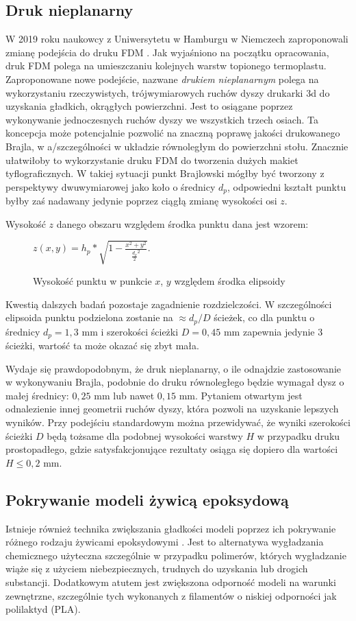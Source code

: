 \documentclass[12pt,a4paper]{article}
\begin{document}
\subsection{Druk nieplanarny}
W 2019 roku naukowcy z Uniwersytetu w Hamburgu w Niemczech zaproponowali zmianę podejścia do druku FDM \cite{nonplanar}. Jak wyjaśniono na początku opracowania, druk FDM polega na umieszczaniu kolejnych warstw topionego termoplastu. Zaproponowane nowe podejście, nazwane \emph{drukiem nieplanarnym} polega na wykorzystaniu rzeczywistych, trójwymiarowych ruchów dyszy drukarki 3d do uzyskania gładkich, okrągłych powierzchni. Jest to osiągane poprzez wykonywanie jednoczesnych ruchów dyszy we wszystkich trzech osiach.
Ta koncepcja może potencjalnie pozwolić na znaczną poprawę jakości drukowanego Brajla, w a/szczególności w układzie równoległym do powierzchni stołu. Znacznie ułatwiłoby to wykorzystanie druku FDM do tworzenia dużych makiet tyflograficznych.
W takiej sytuacji punkt Brajlowski mógłby być tworzony z perspektywy dwuwymiarowej jako koło o średnicy $d_p$, odpowiedni kształt punktu byłby zaś nadawany jedynie poprzez ciągłą zmianę wysokości osi $z$.

Wysokość $z$ danego obszaru względem środka punktu dana jest wzorem:

\begin{figure}
$z(x,y) = h_p * \sqrt{1 - \frac{x^2+y^2}{\frac{d_p}{2}^2}}$.
\caption{Wysokość punktu w punkcie $x$, $y$ względem środka elipsoidy}
\end{figure}

Kwestią dalszych badań pozostaje zagadnienie rozdzielczości. W szczególności elipsoida punktu podzielona zostanie na $\approx d_p/D$ ścieżek, co dla punktu o średnicy $d_p=1,3 \text{ mm}$ i szerokości ścieżki $D=0,45 \text{ mm}$ zapewnia jedynie 3 ścieżki, wartość ta może okazać się zbyt mała.

Wydaje się prawdopodobnym, że druk nieplanarny, o ile odnajdzie zastosowanie w wykonywaniu Brajla, podobnie do druku równoległego będzie wymagał dysz o małej średnicy: $0,25 \text{ mm}$ lub nawet $0,15 \text{ mm}$. Pytaniem otwartym jest odnalezienie innej geometrii ruchów dyszy, która pozwoli na uzyskanie lepszych wyników.
Przy podejściu standardowym można przewidywać, że wyniki szerokości ścieżki $D$ będą tożsame dla podobnej wysokości warstwy $H$ w przypadku druku prostopadłego, gdzie satysfakcjonujące rezultaty osiąga się dopiero dla wartości $H \leq 0,2 \text{ mm}$.

\subsection{Pokrywanie modeli żywicą epoksydową}
Istnieje również technika zwiększania gładkości modeli poprzez ich pokrywanie różnego rodzaju żywicami epoksydowymi \cite{epoxy}. Jest to alternatywa wygładzania chemicznego użyteczna szczególnie w przypadku polimerów, których wygładzanie wiąże się z użyciem niebezpiecznych, trudnych do uzyskania lub drogich substancji.
Dodatkowym atutem jest zwiększona odporność modeli na warunki zewnętrzne, szczególnie tych wykonanych z filamentów o niskiej odporności jak polilaktyd (PLA).
\end{document}
